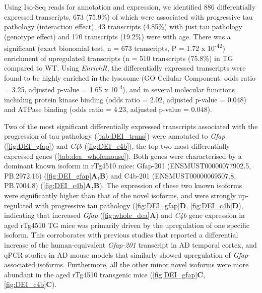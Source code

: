Using Iso-Seq reads for annotation and expression, we identified 886 differentially expressed transcripts, 673 (75.9\%) of which were associated with progressive tau pathology (interaction effect), 43 transcripts (4.85\%) with just tau pathology (genotype effect) and 170 transcripts (19.2\%) were with age. There was a significant (exact bionomial test, n = 673 transcripts, P = 1.72 x 10\textsuperscript{-42}) enrichment of upregulated transcripts (n = 510 transcripts (75.8\%) in TG compared to WT. Using \textit{EnrichR}, the differentially expressed transcripts were found to be highly enriched in the lysosome (GO Cellular Component: odds ratio = 3.25, adjusted p-value = 1.65 x 10\textsuperscript{-4}), and in several molecular functions including protein kinase binding (odds ratio = 2.02, adjusted p-value = 0.048) and ATPase binding (odds ratio = 4.23, adjusted p-value = 0.048).  

Two of the most significant differentially expressed transcripts associated with the progression of tau pathology (\cref{tab:DEI_trans}) were annotated to \textit{Gfap} (\cref{fig:DEI_gfap}) and \textit{C4b} (\cref{fig:DEI_c4b}), the top two most differentially expressed genes (\cref{tab:dea_wholemouse}). Both genes were characterised by a dominant known isoform in rTg4510 mice: Gfap-201 (ENSMUST00000077902.5, PB.2972.16) (\cref{fig:DEI_gfap}\textbf{A,B}) and C4b-201 (ENSMUST00000069507.8, PB.7004.8) (\cref{fig:DEI_c4b}\textbf{A,B}). The expression of these two known isoforms were significantly higher than that of the novel isoforms, and were strongly up-regulated with progressive tau pathology (\cref{fig:DEI_gfap}\textbf{D}, \cref{fig:DEI_c4b}\textbf{D}), indicating that increased \textit{Gfap} (\cref{fig:whole_dea}\textbf{A}) and \textit{C4b} gene expression in aged rTg4510 TG mice was primarily driven by the upregulation of one specific isoform. This corroborates with previous studies that reported a differential increase of the human-equivalent \textit{Gfap-201} transcript in AD temporal cortex\cite{Roelofs2005}, and qPCR studies in AD mouse models that similarly showed upregulation of \textit{Gfap}-associated isoforms\cite{Kamphuis2012}. Furthermore, all the other minor novel isoforms were more abundant in the aged rTg4510 transgenic mice (\cref{fig:DEI_gfap}\textbf{C}, \cref{fig:DEI_c4b}\textbf{C}).


